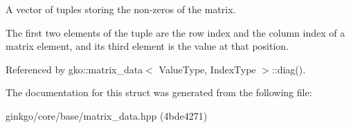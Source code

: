 A vector of tuples storing the non-\/zeros of the matrix. 

The first two elements of the tuple are the row index and the column index of a matrix element, and its third element is the value at that position. 

Referenced by gko\+::matrix\+\_\+data$<$ Value\+Type, Index\+Type $>$\+::diag().



The documentation for this struct was generated from the following file\+:\begin{DoxyCompactItemize}
\item 
ginkgo/core/base/matrix\+\_\+data.\+hpp (4bde4271)\end{DoxyCompactItemize}
